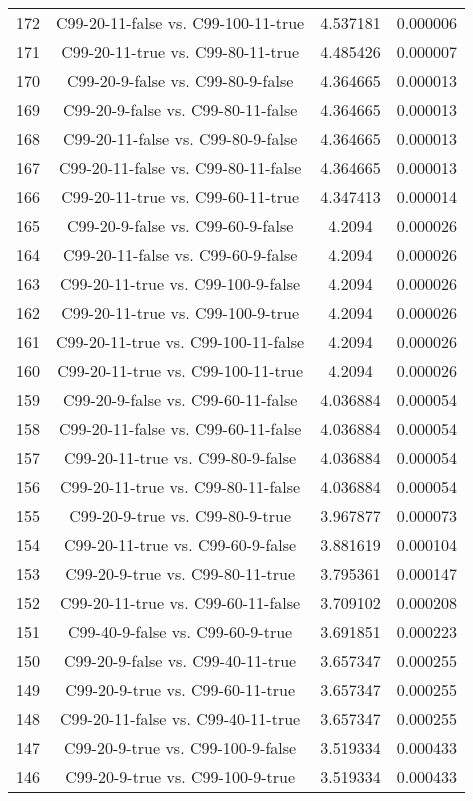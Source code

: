 \documentclass[a4paper,10pt]{article}
\begin{document}
\begin{landscape}
\begin{table}[!htp]
\begin{tabular}{cccc}
172&C99-20-11-false vs. C99-100-11-true&4.537181&0.000006\\
171&C99-20-11-true vs. C99-80-11-true&4.485426&0.000007\\
170&C99-20-9-false vs. C99-80-9-false&4.364665&0.000013\\
169&C99-20-9-false vs. C99-80-11-false&4.364665&0.000013\\
168&C99-20-11-false vs. C99-80-9-false&4.364665&0.000013\\
167&C99-20-11-false vs. C99-80-11-false&4.364665&0.000013\\
166&C99-20-11-true vs. C99-60-11-true&4.347413&0.000014\\
165&C99-20-9-false vs. C99-60-9-false&4.2094&0.000026\\
164&C99-20-11-false vs. C99-60-9-false&4.2094&0.000026\\
163&C99-20-11-true vs. C99-100-9-false&4.2094&0.000026\\
162&C99-20-11-true vs. C99-100-9-true&4.2094&0.000026\\
161&C99-20-11-true vs. C99-100-11-false&4.2094&0.000026\\
160&C99-20-11-true vs. C99-100-11-true&4.2094&0.000026\\
159&C99-20-9-false vs. C99-60-11-false&4.036884&0.000054\\
158&C99-20-11-false vs. C99-60-11-false&4.036884&0.000054\\
157&C99-20-11-true vs. C99-80-9-false&4.036884&0.000054\\
156&C99-20-11-true vs. C99-80-11-false&4.036884&0.000054\\
155&C99-20-9-true vs. C99-80-9-true&3.967877&0.000073\\
154&C99-20-11-true vs. C99-60-9-false&3.881619&0.000104\\
153&C99-20-9-true vs. C99-80-11-true&3.795361&0.000147\\
152&C99-20-11-true vs. C99-60-11-false&3.709102&0.000208\\
151&C99-40-9-false vs. C99-60-9-true&3.691851&0.000223\\
150&C99-20-9-false vs. C99-40-11-true&3.657347&0.000255\\
149&C99-20-9-true vs. C99-60-11-true&3.657347&0.000255\\
148&C99-20-11-false vs. C99-40-11-true&3.657347&0.000255\\
147&C99-20-9-true vs. C99-100-9-false&3.519334&0.000433\\
146&C99-20-9-true vs. C99-100-9-true&3.519334&0.000433\\

\end{tabular}
\end{table}
\end{landscape}
\end{document}
